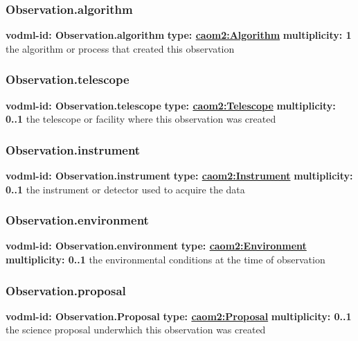     \subsubsection{Observation.algorithm}
      \textbf{vodml-id: Observation.algorithm} \newline
      \textbf{type: \hyperref[sect:Algorithm]{caom2:Algorithm}} \newline
      \textbf{multiplicity: 1} \newline
      the algorithm or process that created this observation

    \subsubsection{Observation.telescope}
      \textbf{vodml-id: Observation.telescope} \newline
      \textbf{type: \hyperref[sect:Telescope]{caom2:Telescope}} \newline
      \textbf{multiplicity: 0..1} \newline
      the telescope or facility where this observation was created

    \subsubsection{Observation.instrument}
      \textbf{vodml-id: Observation.instrument} \newline
      \textbf{type: \hyperref[sect:Instrument]{caom2:Instrument}} \newline
      \textbf{multiplicity: 0..1} \newline
      the instrument or detector used to acquire the data

    \subsubsection{Observation.environment}
      \textbf{vodml-id: Observation.environment} \newline
      \textbf{type: \hyperref[sect:Environment]{caom2:Environment}} \newline
      \textbf{multiplicity: 0..1} \newline
      the environmental conditions at the time of observation

    \subsubsection{Observation.proposal}
      \textbf{vodml-id: Observation.Proposal} \newline
      \textbf{type: \hyperref[sect:Proposal]{caom2:Proposal}} \newline
      \textbf{multiplicity: 0..1} \newline
      the science proposal underwhich this observation was created

